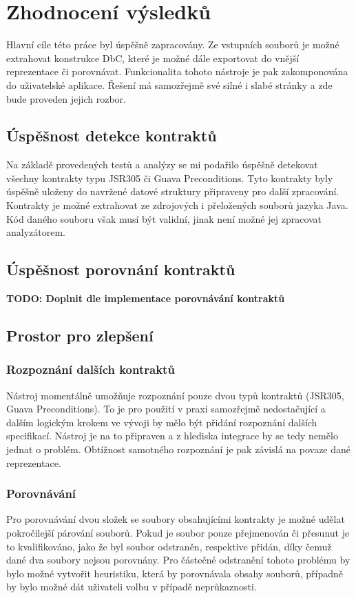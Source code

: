 \chapter{Zhodnocení výsledků}
	Hlavní cíle této práce byl úspěšně zapracovány. Ze vstupních souborů je možné extrahovat konstrukce DbC, které je možné dále exportovat do vnější reprezentace či porovnávat. Funkcionalita tohoto nástroje je pak zakomponována do uživatelské aplikace. Řešení má samozřejmě své silné i slabé stránky a zde bude proveden jejich rozbor.	
	
	
	\section{Úspěšnost detekce kontraktů}
		Na základě provedených testů a analýzy se mi podařilo úspěšně detekovat všechny kontrakty typu JSR305 či Guava Preconditions. Tyto kontrakty byly úspěšně uloženy do navržené datové struktury připraveny pro další zpracování. Kontrakty je možné extrahovat ze zdrojových i přeložených souborů jazyka Java. Kód daného souboru však musí být validní, jinak není možné jej zpracovat analyzátorem.
	
	\section{Úspěšnost porovnání kontraktů}
		\textbf{\textcolor{pblue}{TODO: Doplnit dle implementace porovnávání kontraktů}}
	 	
 	\section{Prostor pro zlepšení}

		\subsection{Rozpoznání dalších kontraktů}
			Nástroj momentálně umožňuje rozpoznání pouze dvou typů kontraktů (JSR305, Guava Preconditions). To je pro použití v praxi samozřejmě nedostačující a dalším logickým krokem ve vývoji by mělo být přidání rozpoznání dalších specifikací. Nástroj je na to připraven a z hlediska integrace by se tedy nemělo jednat o problém. Obtížnost samotného rozpoznání je pak závislá na povaze dané reprezentace.
			
		\subsection{Porovnávání}
			Pro porovnávání dvou složek se soubory obsahujícími kontrakty je možné udělat pokročilejší párování souborů. Pokud je soubor pouze přejmenován či přesunut je to kvalifikováno, jako že byl soubor odstraněn, respektive přidán, díky čemuž dané dva soubory nejsou porovnány. Pro částečné odstranění tohoto problému by bylo možné vytvořit heuristiku, která by porovnávala obsahy souborů, případně by bylo možné dát uživateli volbu v případě neprůkaznosti.\\
			
